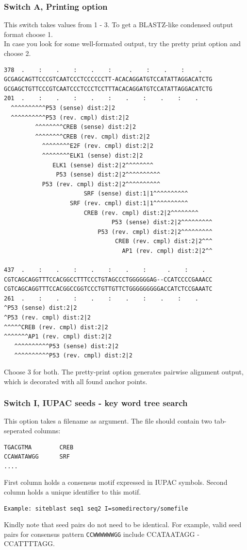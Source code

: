 \documentclass{article}
\begin{document}
\subsubsection*{Switch A, Printing option}
This switch takes values from 1 - 3. To get a BLASTZ-like condensed output format choose 1.\\
In case you look for some well-formated output, try the pretty print option and choose 2.\\
\begin{verbatim}
378  .    :    .    :    .    :     .    :    .    :    .
GCGAGCAGTTCCCGTCAATCCCTCCCCCCTT-ACACAGGATGTCCATATTAGGACATCTG
GCGAGCTGTTCCCGTCAATCCCTCCCTCCTTTACACAGGATGTCCATATTAGGACATCTG
201  .    :    .    :    .    :    .    :    .    :    .
  ^^^^^^^^^^P53 (sense) dist:2|2
  ^^^^^^^^^^P53 (rev. cmpl) dist:2|2
         ^^^^^^^^CREB (sense) dist:2|2
         ^^^^^^^^CREB (rev. cmpl) dist:2|2
           ^^^^^^^^E2F (rev. cmpl) dist:2|2
           ^^^^^^^^ELK1 (sense) dist:2|2
              ELK1 (sense) dist:2|2^^^^^^^^
               P53 (sense) dist:2|2^^^^^^^^^^
           P53 (rev. cmpl) dist:2|2^^^^^^^^^^
                       SRF (sense) dist:1|1^^^^^^^^^^
                   SRF (rev. cmpl) dist:1|1^^^^^^^^^^
                       CREB (rev. cmpl) dist:2|2^^^^^^^^
                               P53 (sense) dist:2|2^^^^^^^^^
                           P53 (rev. cmpl) dist:2|2^^^^^^^^^
                                CREB (rev. cmpl) dist:2|2^^^
                                  AP1 (rev. cmpl) dist:2|2^^

437  .    :    .    :    .    :    .    :      .    :    .
CGTCAGCAGGTTTCCACGGCCTTTCCCTGTAGCCCTGGGGGGAG--CCATCCCCGAAACC
CGTCAGCAGGTTTCCACGGCCGGTCCCTGTTGTTCTGGGGGGGGGACCATCTCCGAAATC
261  .    :    .    :    .    :    .    :    .    :    .
^P53 (sense) dist:2|2
^P53 (rev. cmpl) dist:2|2
^^^^^CREB (rev. cmpl) dist:2|2
^^^^^^^AP1 (rev. cmpl) dist:2|2
   ^^^^^^^^^^P53 (sense) dist:2|2
   ^^^^^^^^^^P53 (rev. cmpl) dist:2|2
\end{verbatim}
Choose 3 for both. The pretty-print option generates pairwise alignment output, which is decorated with all found anchor points.
\subsubsection*{Switch I, IUPAC seeds - key word tree search}
This option takes a filename as argument. The file should contain two tab-seperated columns:
\begin{verbatim}
TGACGTMA        CREB
CCAWATAWGG      SRF
....
\end{verbatim}
First column holds a consensus motif expressed in IUPAC symbols. Second column holds a unique identifier to this motif.
\begin{verbatim}
Example: siteblast seq1 seq2 I=somedirectory/somefile
\end{verbatim}
Kindly note that seed pairs do not need to be identical.
For example, valid seed pairs for consensus pattern {\tt CCWWWWWWGG} include CCATAATAGG - CCATTTTAGG.
\end{document}
